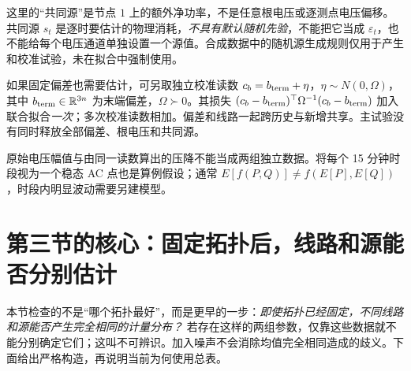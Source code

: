 \documentclass[UTF8,fontset=fandol,11pt,a4paper]{ctexart}
\newcommand{\R}{\mathbb R}
\begin{document}
这里的“共同源”是节点 $1$ 上的额外净功率，不是任意根电压或逐测点电压偏移。共同源 $s_t$ 是逐时要估计的物理消耗，\emph{不具有默认随机先验}，不能把它当成 $\varepsilon_t$，也不能给每个电压通道单独设置一个源值。合成数据中的随机源生成规则仅用于产生和校准试验，未在拟合中强制使用。

如果固定偏差也需要估计，可另取独立校准读数 $c_b=b_{\rm term}+\eta$，$\eta\sim N(0,\Omega)$，其中 $b_{\rm term}\in\R^{3n}$ 为末端偏差，$\Omega\succ0$。其损失 $(c_b-b_{\rm term})^\top\Omega^{-1}(c_b-b_{\rm term})$ 加入联合拟合\emph{一次}；多次校准读数相加。偏差和线路一起跨历史与新增共享。主试验没有同时释放全部偏差、根电压和共同源。

原始电压幅值与由同一读数算出的压降不能当成两组独立数据。将每个 15 分钟时段视为一个稳态 AC 点也是算例假设；通常 $E[f(P,Q)]\ne f(E[P],E[Q])$，时段内明显波动需要另建模型。

\section{第三节的核心：固定拓扑后，线路和源能否分别估计}
\label{sec:identifiability}
本节检查的不是“哪个拓扑最好”，而是更早的一步：\emph{即使拓扑已经固定，不同线路和源能否产生完全相同的计量分布？}
若存在这样的两组参数，仅靠这些数据就不能分别确定它们；这叫不可辨识。加入噪声不会消除均值完全相同造成的歧义。下面给出严格构造，再说明当前为何使用总表。
\end{document}
